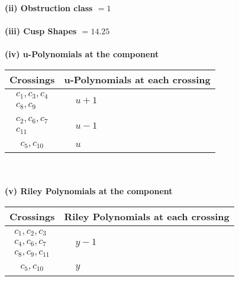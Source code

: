 \documentclass[1p]{elsarticle_modified}
\theoremstyle{definition}
\begin{document}
\flushleft \textbf{(ii) Obstruction class $= 1$}\\~\\
\flushleft \textbf{(iii) Cusp Shapes $= 14.25$}\\~\\
\newpage\renewcommand{\arraystretch}{1}
\flushleft \textbf{(iv) u-Polynomials at the component}\newline \\
\begin{tabular}{m{50pt}|m{274pt}}
Crossings & \hspace{64pt}u-Polynomials at each crossing \\
\hline $$\begin{aligned}c_{1},c_{3},c_{4}\\c_{8},c_{9}\end{aligned}$$&$\begin{aligned}
&u+1
\end{aligned}$\\
\hline $$\begin{aligned}c_{2},c_{6},c_{7}\\c_{11}\end{aligned}$$&$\begin{aligned}
&u-1
\end{aligned}$\\
\hline $$\begin{aligned}c_{5},c_{10}\end{aligned}$$&$\begin{aligned}
&u
\end{aligned}$\\
\hline
\end{tabular}\\~\\
\newpage\renewcommand{\arraystretch}{1}
\flushleft \textbf{(v) Riley Polynomials at the component}\newline \\
\begin{tabular}{m{50pt}|m{274pt}}
Crossings & \hspace{64pt}Riley Polynomials at each crossing \\
\hline $$\begin{aligned}c_{1},c_{2},c_{3}\\c_{4},c_{6},c_{7}\\c_{8},c_{9},c_{11}\end{aligned}$$&$\begin{aligned}
&y-1
\end{aligned}$\\
\hline $$\begin{aligned}c_{5},c_{10}\end{aligned}$$&$\begin{aligned}
&y
\end{aligned}$\\
\hline
\end{tabular}\\~\\
\end{document}
